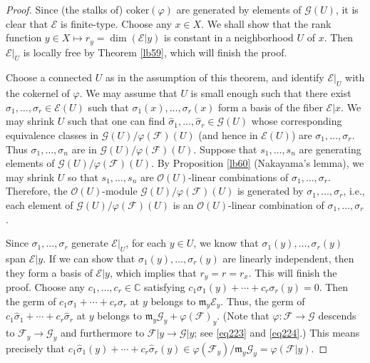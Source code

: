 \documentclass[12pt,b5paper,notitlepage]{report}
\theoremstyle{definition}
\theoremstyle{plain}
\newcommand{\fk}{\mathfrak}
\newcommand{\wht}{\widehat}
\newcommand{\scr}{\mathscr}
\newcommand{\coker}{\mathrm{coker}}
\newcommand{\Cbb}{\mathbb C}
\numberwithin{equation}{section}
\begin{document}
\begin{proof}
Since (the stalks of) $\coker(\varphi)$ are generated by elements of $\scr G(U)$, it is clear that $\scr E$ is finite-type. Choose any $x\in X$. We shall show that the rank function $y\in X\mapsto r_y=\dim(\scr E|y)$ is  constant in a neighborhood $U$ of $x$. Then $\scr E|_U$ is locally free by Theorem \ref{lb59}, which will finish the proof.

Choose a connected $U$ as in the assumption of this theorem, and identify $\scr E|_U$ with the cokernel of $\varphi$.   We may assume that $U$ is small enough such that there exist $\sigma_1,\dots,\sigma_r\in\scr E(U)$ such that $\sigma_1(x),\dots,\sigma_r(x)$ form a basis of the fiber $\scr E|x$. We may shrink $U$ such that one can find $\wht\sigma_1,\dots,\wht\sigma_r\in\scr G(U)$ whose corresponding equivalence classes in $\scr G(U)/\varphi(\scr F)(U)$ (and hence in $\scr E(U)$) are $\sigma_1,\dots,\sigma_r$. Thus $\sigma_1,\dots,\sigma_n$ are in $\scr G(U)/\varphi(\scr F)(U)$. Suppose that $s_1,\dots,s_n$ are generating elements of $\scr G(U)/\varphi(\scr F)(U)$. By Proposition \ref{lb60} (Nakayama's lemma), we may shrink $U$ so that $s_1,\dots,s_n$ are $\scr O(U)$-linear combinations of $\sigma_1,\dots,\sigma_r$. Therefore, the $\scr O(U)$-module $\scr G(U)/\varphi(\scr F)(U)$ is generated by $\sigma_1,\dots,\sigma_r$, i.e., each element of $\scr G(U)/\varphi(\scr F)(U)$ is an $\scr O(U)$-linear combination of $\sigma_1,\dots,\sigma_r$.

Since $\sigma_1,\dots,\sigma_r$ generate   $\scr E|_U$, for each $y\in U$, we know that $\sigma_1(y),\dots,\sigma_r(y)$ span $\scr E|y$. If we can show that $\sigma_1(y),\dots,\sigma_r(y)$ are linearly independent, then they form a basis of $\scr E|y$, which implies that $r_y=r=r_x$. This will finish the proof. Choose any $c_1,\dots,c_r\in\Cbb$ satisfying  $c_1\sigma_1(y)+\cdots+c_r\sigma_r(y)=0$. Then the germ of $c_1\sigma_1+\cdots+c_r\sigma_r$ at $y$ belongs to $\fk m_y\scr E_y$. Thus, the germ of $c_1\wht \sigma_1+\cdots+c_r\wht \sigma_r$ at $y$ belongs to $\fk m_y\scr G_y+\varphi(\scr F)_y$. (Note that $\varphi:\scr F\rightarrow\scr G$ descends to $\scr F_y\rightarrow \scr G_y$ and furthermore to $\scr F|y\rightarrow\scr G|y$; see \eqref{eq223} and \eqref{eq224}.) This means precisely that $c_1\wht \sigma_1(y)+\cdots+c_r\wht \sigma_r(y)\in\varphi(\scr F_y)/\fk m_y\scr G_y=\varphi(\scr F|y)$. 


\end{proof}
\end{document}
